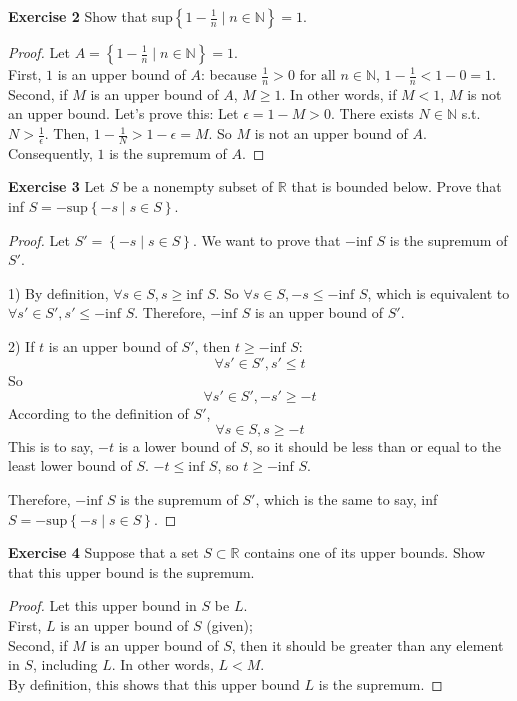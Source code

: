 \documentclass[12pt]{article}
\newcommand{\bbN}{\mathbb{N}}
\newcommand{\bbR}{\mathbb{R}}
\theoremstyle{definition}
\numberwithin{equation}{subsection}
\begin{document}
\textbf{Exercise 2} Show that sup$\left\{1-\frac{1}{n} 
\mid n \in \mathbb{N}\right\}=1$.
\begin{proof}
Let $A = \left\{1-\frac{1}{n} 
\mid n \in \mathbb{N}\right\}=1$.\\
First, $1$ is an upper bound of $A$: because $\frac{1}{n} > 0 \text{ for all }
n \in \bbN$, $1-\frac{1}{n} < 1-0=1$. \\
Second, if $M$ is an upper bound of $A$, $M \geq 1$. In other words, if $M < 1$, $M$ is not an upper bound. Let's prove this: Let $\epsilon = 1 - M > 0$. There exists $N \in \bbN$ s.t. $N > \frac{1}{\epsilon}$. Then, $1-\frac{1}{N} > 1-\epsilon = M$. So $M$ is not an upper bound of $A$.\\
Consequently, $1$ is the supremum of $A$.
\end{proof}

\textbf{Exercise 3} Let $S$ be a nonempty subset of $\bbR$ that is bounded below. Prove that
\\inf $S=-\text{sup}\left\{-s \mid s \in S \right\}$.
\newcommand{\infS}{\text{inf } S}
\newcommand{\supS}{\text{sup } S'}
\begin{proof}
Let $S' = \left\{-s \mid s \in S \right\}$. We want to prove that $-\infS$ is the supremum of $S'$.

1) By definition, $\forall s \in S, s \geq \infS$. So $\forall s \in S, -s \leq -\infS$, which is equivalent to $\forall s' \in S', s' \leq -\infS$. Therefore, $-\infS$ is an upper bound of $S'$.

2) If $t$ is an upper bound of $S'$, then $t \geq -\infS$:
$$
\forall s' \in S', s' \leq t
$$
So
$$
\forall s' \in S', -s' \geq -t
$$
According to the definition of $S'$,
$$
\forall s \in S, s \geq -t
$$
This is to say, $-t$ is a lower bound of $S$, so it should be less than or equal to the least lower bound of $S$. $-t\leq \infS$, so $t \geq -\infS$.

Therefore, $-\infS$ is the supremum of $S'$, which is the same to say, inf $S=-\text{sup}\left\{-s \mid s \in S \right\}$.
\end{proof}

\textbf{Exercise 4} Suppose that a set $S \subset \bbR$ contains one of
 its upper bounds. Show that this upper bound is the supremum.
\begin{proof}
Let this upper bound in $S$ be $L$.\\
First, $L$ is an upper bound of $S$ (given);\\
Second, if $M$ is an upper bound of $S$, then it should be greater than any
element in $S$, including $L$. In other words, $L < M$.\\
By definition, this shows that this upper bound $L$ is the supremum. 
\end{proof}
\end{document}
